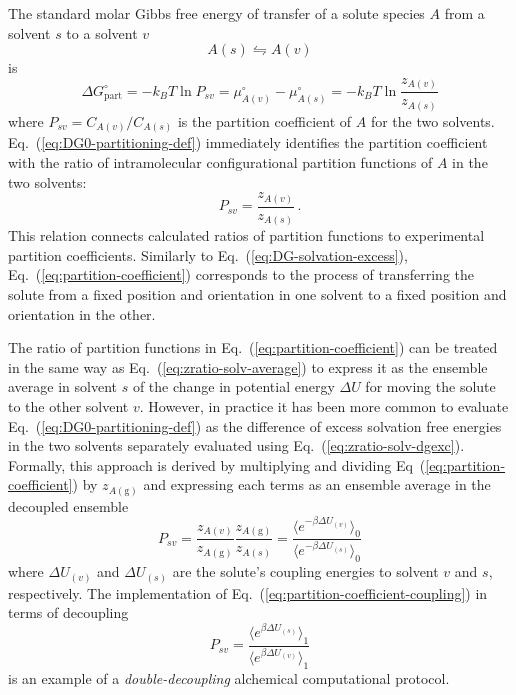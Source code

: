 \documentclass[9pt,bestpractices,pubversion]{livecoms}
\begin{document}
The standard molar Gibbs free energy of transfer of a solute species $A$ from a  solvent $s$ to a solvent $v$
\begin{equation}
A(s)  \leftrightharpoons A(v)
\end{equation}
is
\begin{equation}
  \Delta G^\circ_{\mathrm{part}} = -k_B T \ln P_{sv} = \mu^\circ_{A(v)}  - \mu^\circ_{A(s)} = -k_B T \ln \frac{z_{A(v)}}{z_{A(s)}}
  \label{eq:DG0-partitioning-def}
\end{equation}
where $P_{sv} = C_{A(v)}/C_{A(s)}$ is the partition coefficient of $A$ for the two solvents.~\cite{rustenburg2016measuring} Eq.~(\ref{eq:DG0-partitioning-def}) 
immediately identifies the partition coefficient with the ratio of intramolecular configurational partition functions of $A$ in the two solvents:
\begin{equation}
  P_{sv} = \frac{z_{A(v)}}{z_{A(s)}} \, .
  \label{eq:partition-coefficient}
\end{equation}
This relation connects calculated ratios of partition functions to experimental partition coefficients. Similarly to Eq.~(\ref{eq:DG-solvation-excess}), Eq.~(\ref{eq:partition-coefficient}) corresponds to the process of transferring the solute from a fixed position and orientation in one solvent to a fixed position and orientation in the other.

The ratio of partition functions in Eq.~(\ref{eq:partition-coefficient}) can be treated in the same way as Eq.~(\ref{eq:zratio-solv-average}) to express it as the ensemble average in solvent $s$ of the change in potential energy $\Delta U$ for moving the solute to the other solvent $v$. However, in practice it has been more common to evaluate Eq.~(\ref{eq:DG0-partitioning-def}) as the difference of excess solvation free energies in the two solvents separately evaluated using Eq.~(\ref{eq:zratio-solv-dgexc}).~\cite{bosisio2016blinded} Formally, this approach is derived by multiplying and dividing Eq~(\ref{eq:partition-coefficient}) by $z_{A(\mathrm{g})}$ and expressing each terms as an ensemble average in the decoupled ensemble
\begin{equation}
  P_{sv} = \frac{z_{A(v)}}{z_{A(\mathrm{g})}}  \frac{z_{A(\mathrm{g})}}{z_{A(s)}} = \frac{\langle e^{-\beta \Delta U_{(v)}} \rangle_0}{\langle e^{-\beta \Delta U_{(s)} } \rangle_0 }
  \label{eq:partition-coefficient-coupling}
\end{equation}
where $\Delta U_{(v)}$ and $\Delta U_{(s)}$ are the solute's coupling energies to solvent $v$ and $s$, respectively. 
The implementation of Eq.~(\ref{eq:partition-coefficient-coupling}) in terms of decoupling
\begin{equation}
P_{sv} = \frac{\langle e^{\beta \Delta U_{(s)}} \rangle_1}{\langle e^{\beta \Delta U_{(v)} } \rangle_1 }
\label{eq:partition-coefficient-decoupling}
\end{equation}
is an example of a \emph{double-decoupling} alchemical computational protocol.~\cite{hermans1986freeenergy,gilson1997statisticalthermodynamic}
\end{document}
